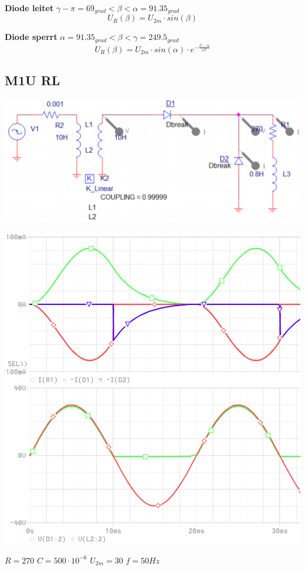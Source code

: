 \textbf{Diode leitet} $ \gamma - \pi = 69_{grad} < \beta < \alpha = 91.35_{grad} $\newline
\[  U_R(\beta) = U_{2m} \cdot sin(\beta)\]

\textbf{Diode sperrt} $ \alpha = 91.35_{grad}< \beta < \gamma = 249.5_{grad}  $\newline
\[  U_R(\beta)  =  U_{2m} \cdot sin(\alpha) \cdot e^{-\frac{\beta - \alpha}{\omega \tau}}\]

\clearpage
\subsection*{M1U RL}
\begin{minipage}{0.4\linewidth}
    \includegraphics[width=\linewidth]{images/Rechnungsbsp/M1URL}
\end{minipage}
\begin{minipage}{0.2\linewidth}
    \includegraphics[width=\linewidth]{images/Rechnungsbsp/M1URLKL}
\end{minipage}
\begin{minipage}{5cm}
    $ R = 270 $ \newline
    $ C = 500 \cdot 10^{-6} $\newline
    $ U_{2m} = 30 $ \newline
    $ f = 50 Hz $   
\end{minipage}

